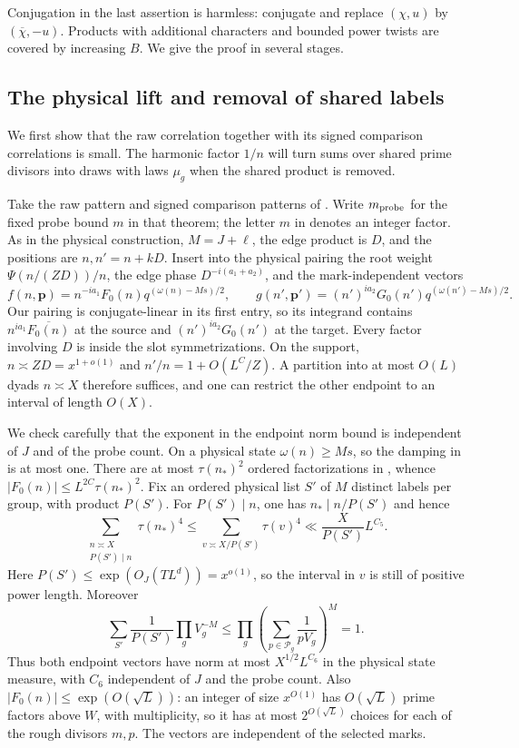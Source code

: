 Conjugation in the last assertion is harmless: conjugate
 and replace $(\chi,u)$ by $(\overline\chi,-u)$.
Products with additional characters and bounded power twists are covered
by increasing $B$. We give the proof in several stages.

\subsection{The physical lift and removal of shared labels}

We first show that the raw correlation together with its signed
comparison correlations is small. The harmonic factor $1/n$ will
turn sums over shared prime divisors into draws with laws $\mu_g$
when the shared product is removed.

Take the raw pattern and signed comparison patterns of .
Write $m_{\rm probe}$ for the fixed probe bound $m$ in that theorem;
the letter $m$ in  denotes an integer factor.
As in the physical construction, $M=J+\ell$, the edge product is $D$,
and the positions are $n,n'=n+kD$. Insert into the physical pairing the
root weight $\Psi(n/(ZD))/n$, the edge phase $D^{-i(a_1+a_2)}$, and
the mark-independent vectors
\begin{equation}\label{eq:lift-vectors}
 f(n,\mathbf p)=n^{-ia_1}F_0(n)q^{(\omega(n)-Ms)/2},
 \qquad
 g(n',\mathbf p')=(n')^{ia_2}G_0(n')q^{(\omega(n')-Ms)/2}.
\end{equation}
Our pairing is conjugate-linear in its first entry, so its integrand
contains $n^{ia_1}\overline{F_0(n)}$ at the source and
$(n')^{ia_2}G_0(n')$ at the target.
Every factor involving $D$ is inside the slot symmetrizations.
On the support, $n\asymp ZD=x^{1+o(1)}$ and
$n'/n=1+O(L^C/Z)$. A partition into at most $O(L)$ dyads
$n\asymp X$ therefore suffices, and one can restrict the other endpoint
to an interval of length $O(X)$.

We check carefully that the exponent in the endpoint norm bound is
independent of $J$ and of the probe count. On a physical state
$\omega(n)\geq Ms$, so the damping in  is at most
one. There are at most $\tau(n_*)^2$ ordered factorizations in
, whence
$|F_0(n)|\leq L^{2C}\tau(n_*)^2$. Fix an ordered physical list
$S'$ of $M$ distinct labels per group, with product $P(S')$.
For $P(S')\mid n$, one has $n_*\mid n/P(S')$ and hence
\[
 \sum_{\substack{n\asymp X\\P(S')\mid n}}\tau(n_*)^4
 \leq\sum_{v\asymp X/P(S')}\tau(v)^4
 \ll\frac{X}{P(S')}L^{C_5}.
\]
Here $P(S')\leq\exp(O_J(TL^d))=x^{o(1)}$, so the interval in $v$
is still of positive power length. Moreover
\[
 \sum_{S'}\frac1{P(S')}\prod_g V_g^{-M}
 \leq\prod_g\left(\sum_{p\in\mathcal P_g}\frac1{pV_g}\right)^M=1.
\]
Thus both endpoint vectors have norm at most $X^{1/2}L^{C_6}$ in the
physical state measure, with $C_6$ independent of $J$ and the probe count.
Also $|F_0(n)|\leq\exp(O(\sqrt L))$: an integer of size $x^{O(1)}$
has $O(\sqrt L)$ prime factors above $W$, with multiplicity, so it has
at most $2^{O(\sqrt L)}$ choices for each of the rough divisors $m,p$.
The vectors are independent of the selected marks.

